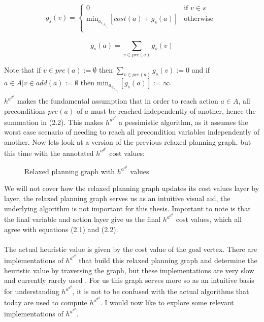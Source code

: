 \begin{equation}
 g_s(v) = 
  \begin{cases} 
   0 & \text{if } v \in s \\
   \text{min}_a_\in_A_|_v_\in_a_d_d_(_a_) [cost(a) + g_s(a)]       & \text{otherwise } 
  \end{cases}
\end{equation}

\begin{equation}
    g_s(a) = \sum_{v \in pre(a)}^{} g_s(v)
\end{equation}

Note that if $v \in pre(a) := \emptyset$ then $\sum_{v \in pre(a)}^{} g_s(v) := 0$ and if $a \in A | v \in add(a) := \emptyset$ then $\text{min}_a_\in_A_|_v_\in_a_d_d_(_a_) [g_s(a)] := \infty$.\\

$h^a^d^d$ makes the fundamental assumption that in order to reach action $a \in A$, all preconditions $pre(a)$ of $a$ must be reached independently of another, hence the summation in (2.2). This makes $h^a^d^d$ a pessimistic algorithm, as it assumes the worst case scenario of needing to reach all precondition variables independently of another. Now lets look at a version of the previous relaxed planning graph, but this time with the annotated $h^a^d^d$ cost values:

\begin{figure}
\centering

\caption{Relaxed planning graph with $h^a^d^d$ values}
\label{fig:machine}
\end{figure}
We will not cover how the relaxed planning graph updates its cost values layer by layer, the relaxed planning graph serves us as an intuitive visual aid, the underlying algorithm is not important for this thesis. Important to note is that the final variable and action layer give us the final $h^a^d^d$ cost values, which all agree with equations (2.1) and (2.2).\\\\
The actual heuristic value is given by the cost value of the goal vertex. There are implementations of $h^a^d^d$ that build this relaxed planning graph and determine the heuristic value by traversing the graph, but these implementations are very slow and currently rarely used \cite{main}. For us this graph serves more so as an intuitive basis for understanding $h^a^d^d$, it is not to be confused with the actual algorithms that today are used to compute $h^a^d^d$. I would now like to explore some relevant implementations of $h^a^d^d$.
\newpage

